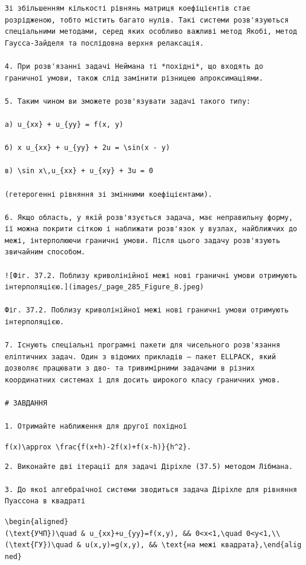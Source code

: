 \documentclass[
  ukrainian,
]{article}
\begin{document}
\begin{verbatim}
Зі збільшенням кількості рівнянь матриця коефіцієнтів стає розрідженою, тобто містить багато нулів. Такі системи розв'язуються спеціальними методами, серед яких особливо важливі метод Якобі, метод Гаусса-Зайделя та послідовна верхня релаксація.

4. При розв'язанні задачі Неймана ті *похідні*, що входять до граничної умови, також слід замінити різницею апроксимаціями.

5. Таким чином ви зможете розв'язувати задачі такого типу:

а) u_{xx} + u_{yy} = f(x, y)

б) x u_{xx} + u_{yy} + 2u = \sin(x - y)

в) \sin x\,u_{xx} + u_{xy} + 3u = 0

(гетерогенні рівняння зі змінними коефіцієнтами).

6. Якщо область, у якій розв'язується задача, має неправильну форму, її можна покрити сіткою і наближати розв'язок у вузлах, найближчих до межі, інтерполюючи граничні умови. Після цього задачу розв'язують звичайним способом.

![Фіг. 37.2. Поблизу криволінійної межі нові граничні умови отримують інтерполяцією.](images/_page_285_Figure_8.jpeg)

Фіг. 37.2. Поблизу криволінійної межі нові граничні умови отримують інтерполяцією.

7. Існують спеціальні програмні пакети для чисельного розв'язання еліптичних задач. Один з відомих прикладів — пакет ELLPACK, який дозволяє працювати з дво- та тривимірними задачами в різних координатних системах і для досить широкого класу граничних умов.

# ЗАВДАННЯ

1. Отримайте наближення для другої похідної
\end{verbatim}

\texttt{f\textquotesingle{}\textquotesingle{}(x)\textbackslash{}approx\ \textbackslash{}frac\{f(x+h)-2f(x)+f(x-h)\}\{h\^{}2\}.}

\begin{verbatim}
2. Виконайте дві ітерації для задачі Діріхле (37.5) методом Лібмана.

3. До якої алгебраїчної системи зводиться задача Діріхле для рівняння Пуассона в квадраті
\end{verbatim}

\texttt{\textbackslash{}begin\{aligned\}(\textbackslash{}text\{УЧП\})\textbackslash{}quad\ \&\ u\_\{xx\}+u\_\{yy\}=f(x,y),\ \&\&\ 0\textless{}x\textless{}1,\textbackslash{}quad\ 0\textless{}y\textless{}1,\textbackslash{}\textbackslash{}(\textbackslash{}text\{ГУ\})\textbackslash{}quad\ \&\ u(x,y)=g(x,y),\ \&\&\ \textbackslash{}text\{на\ межі\ квадрата\},\textbackslash{}end\{aligned\}}
\end{document}
